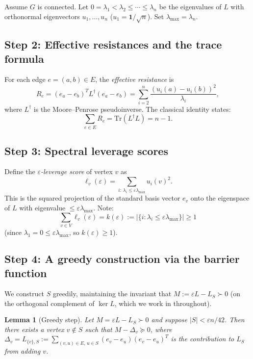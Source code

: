 \documentclass[12pt]{article}
\newtheorem{lemma}[theorem]{Lemma}
\begin{document}
Assume $G$ is connected.  Let $0 = \lambda_1 < \lambda_2 \leq \cdots \leq \lambda_n$ be the eigenvalues of $L$ with orthonormal eigenvectors $u_1, \ldots, u_n$ ($u_1 = \mathbf{1}/\sqrt{n}$).  Set $\lambda_{\max} = \lambda_n$.

\subsection*{Step 2: Effective resistances and the trace formula}

For each edge $e=(a,b)\in E$, the \emph{effective resistance} is
\[
  R_e = (e_a - e_b)^T L^\dagger (e_a - e_b) = \sum_{i=2}^n \frac{(u_i(a)-u_i(b))^2}{\lambda_i},
\]
where $L^\dagger$ is the Moore--Penrose pseudoinverse.  The classical identity states:
\begin{equation}
  \label{eq:trace}
  \sum_{e\in E} R_e = \mathrm{Tr}(L^\dagger L) = n - 1.
\end{equation}

\subsection*{Step 3: Spectral leverage scores}

Define the \emph{$\varepsilon$-leverage score} of vertex $v$ as
\[
  \ell_v(\varepsilon) = \sum_{i:\,\lambda_i \leq \varepsilon\lambda_{\max}} u_i(v)^2.
\]
This is the squared projection of the standard basis vector $e_v$ onto the eigenspace of $L$ with eigenvalue $\leq \varepsilon\lambda_{\max}$.  Note:
\[
  \sum_{v\in V} \ell_v(\varepsilon) = k(\varepsilon) := |\{i : \lambda_i \leq \varepsilon\lambda_{\max}\}| \geq 1
\]
(since $\lambda_1 = 0 \leq \varepsilon\lambda_{\max}$, so $k(\varepsilon)\geq 1$).

\subsection*{Step 4: A greedy construction via the barrier function}

We construct $S$ greedily, maintaining the invariant that $M := \varepsilon L - L_S \succ 0$ (on the orthogonal complement of $\ker L$, which we work in throughout).

\begin{lemma}[Greedy step]
  \label{lem:greedy}
  Let $M = \varepsilon L - L_S \succ 0$ and suppose $|S| < \varepsilon n/42$.  Then there exists a vertex $v \notin S$ such that $M - \Delta_v \succeq 0$, where $\Delta_v = L_{\{v\},S} := \sum_{(v,u)\in E,\,u\in S}(e_v-e_u)(e_v-e_u)^T$ is the contribution to $L_S$ from adding $v$.
\end{lemma}
\end{document}
